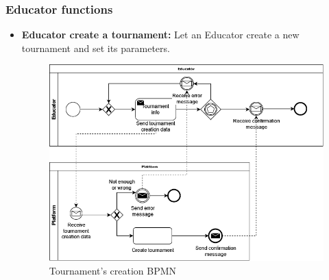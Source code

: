 \documentclass{article}
\begin{document}
{\subsubsection{Educator functions}
\begin{itemize}
    \item \textbf{Educator create a tournament:} Let an Educator create a new tournament and set its parameters.
          \begin{figure}[H]
              \centering
              \includegraphics[scale=0.35]{images/BPMN/BPMN8.png}
              \caption{Tournament's creation BPMN}
              \label{fig:TournamentCreationBPMN}
          \end{figure}


\end{itemize}}
\end{document}
